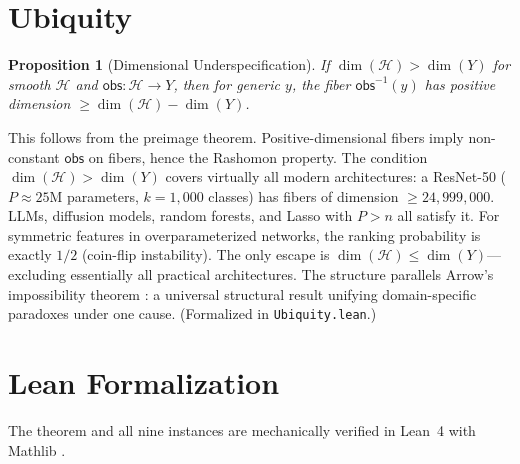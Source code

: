 \documentclass{article}
\newtheorem{proposition}{Proposition}
\newcommand{\sH}{\mathcal{H}}
\begin{document}
\section{Ubiquity}
\label{sec:ubiquity}

\begin{proposition}[Dimensional Underspecification]
\label{prop:generic}
If $\dim(\sH) > \dim(Y)$ for smooth $\sH$ and $\mathsf{obs}: \sH \to Y$, then for generic $y$, the fiber $\mathsf{obs}^{-1}(y)$ has positive dimension $\geq \dim(\sH) - \dim(Y)$.
\end{proposition}

This follows from the preimage theorem.  Positive-dimensional fibers imply non-constant $\mathsf{obs}$ on fibers, hence the Rashomon property.  The condition $\dim(\sH) > \dim(Y)$ covers virtually all modern architectures: a ResNet-50 ($P \approx 25$M parameters, $k=1{,}000$ classes) has fibers of dimension $\geq 24{,}999{,}000$.  LLMs, diffusion models, random forests, and Lasso with $P > n$ all satisfy it.  For symmetric features in overparameterized networks, the ranking probability is exactly $1/2$ (coin-flip instability).  The only escape is $\dim(\sH) \leq \dim(Y)$---excluding essentially all practical architectures.  The structure parallels Arrow's impossibility theorem \citep{arrow1951social}: a universal structural result unifying domain-specific paradoxes under one cause.  (Formalized in \texttt{Ubiquity.lean}.)

\section{Lean Formalization}
\label{sec:lean}

The theorem and all nine instances are mechanically verified in Lean~4 \citep{demoura2021lean4} with Mathlib \citep{mathlib2020}.
\end{document}
